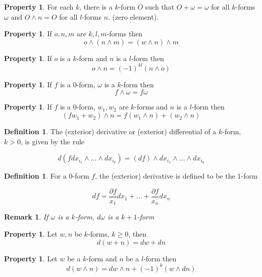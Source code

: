 \documentclass[12pt]{article}
\theoremstyle{plain}
\newtheorem*{remark}{Remark}
\theoremstyle{definition}
\newtheorem{definition}[theorem]{Definition}
\newtheorem{property}[theorem]{Property}
\begin{document}
\begin{property}
    For each $k$, there is a $k$-form $O$ such that $O + \omega = \omega$ for all $k$-forms $\omega$ and $O \wedge n = O$ for all $l$-forms $n$. (zero element).
\end{property}

\begin{property}
    If $o,n,m$ are $k,l,m$-forms then
    $$o\wedge(n\wedge m) = (w\wedge n) \wedge m$$
\end{property}

\begin{property}
    If $o$ is a $k$-form and $n$ is a $l$-form then
    $$o \wedge n = (-1)^{kl} (n\wedge o)$$
\end{property}

\begin{property}
    If $f$ is a 0-form, $\omega$ is a $k$-form then
    $$f\wedge \omega = f\omega$$
\end{property}

\begin{property}
    If $f$ is a 0-form, $w_1, w_2$ are $k$-forms and $n$ is a $l$-form then
    $$(fw_1 + w_2)\wedge n = f(w_1 \wedge n) + (w_2 \wedge n)$$
\end{property}

\begin{definition}
    The (exterior) derivative or (exterior) differential of a $k$-form, $k > 0$, is given by the rule

    $$d(fdx_{i_1} \wedge ... \wedge dx_{i_k}) = (df)\wedge dx_{i_1} \wedge ... \wedge dx_{i_k}$$
\end{definition}

\begin{definition}
    For a 0-form $f$, the (exterior) derivative is defined to be the 1-form

    $$df = \frac{\partial f}{x_1}dx_1 + ... + \frac{\partial f}{x_n}dx_n$$
\end{definition}

\begin{remark}
    If $\omega$ is a $k$-form, $d\omega$ is a $k+1$-form
\end{remark}

\begin{property}
    Let $w,n$ be $k$-forms, $k\geq 0$, then
    $$d(w + n) = dw + dn$$
\end{property}

\begin{property}
    Let $w$ be a $k$-form and $n$ be a $l$-form then
    $$d(w \wedge n) = dw \wedge n + (-1)^k (w \wedge dn)$$
\end{property}
\end{document}
